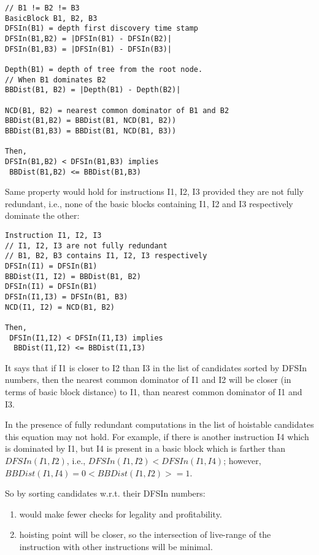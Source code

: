 \documentclass{sig-alternate}
\begin{document}
\begin{verbatim}
// B1 != B2 != B3
BasicBlock B1, B2, B3
DFSIn(B1) = depth first discovery time stamp
DFSIn(B1,B2) = |DFSIn(B1) - DFSIn(B2)|
DFSIn(B1,B3) = |DFSIn(B1) - DFSIn(B3)|

Depth(B1) = depth of tree from the root node.
// When B1 dominates B2
BBDist(B1, B2) = |Depth(B1) - Depth(B2)|

NCD(B1, B2) = nearest common dominator of B1 and B2
BBDist(B1,B2) = BBDist(B1, NCD(B1, B2))
BBDist(B1,B3) = BBDist(B1, NCD(B1, B3))

Then,
DFSIn(B1,B2) < DFSIn(B1,B3) implies
 BBDist(B1,B2) <= BBDist(B1,B3)
\end{verbatim}

Same property would hold for instructions I1, I2, I3 provided they are not fully
redundant, i.e., none of the basic blocks containing I1, I2 and I3 respectively
dominate the other:

\begin{verbatim}
Instruction I1, I2, I3
// I1, I2, I3 are not fully redundant
// B1, B2, B3 contains I1, I2, I3 respectively
DFSIn(I1) = DFSIn(B1)
BBDist(I1, I2) = BBDist(B1, B2)
DFSIn(I1) = DFSIn(B1)
DFSIn(I1,I3) = DFSIn(B1, B3)
NCD(I1, I2) = NCD(B1, B2)

Then,
 DFSIn(I1,I2) < DFSIn(I1,I3) implies
  BBDist(I1,I2) <= BBDist(I1,I3)
\end{verbatim}

It says that if I1 is closer to I2 than I3 in the list of candidates sorted by
DFSIn numbers, then the nearest common dominator of I1 and I2 will be closer (in
terms of basic block distance) to I1, than nearest common dominator of I1 and
I3.

In the presence of fully redundant computations in the list of hoistable
candidates this equation may not hold. For example, if there is another
instruction I4 which is dominated by I1, but I4 is present in a basic block
which is farther than $DFSIn(I1, I2)$, i.e., $DFSIn(I1,I2) < DFSIn(I1,I4)$;
however, $BBDist(I1,I4) = 0 < BBDist(I1,I2) >=1$.

So by sorting candidates w.r.t. their DFSIn numbers:
\begin{enumerate}
\item would make fewer checks for legality and profitability.
\item hoisting point will be closer, so the intersection of live-range of the
  instruction with other instructions will be minimal.
\end{enumerate}
\end{document}
